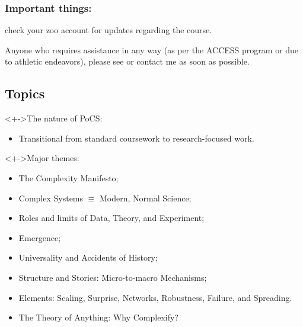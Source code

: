 \begin{frame}
  \frametitle{Important things:}

  \begin{block}{}
    \importantdates
  \end{block}

  \begin{block}{}
     check your zoo account for updates regarding the course.
  \end{block}

  \begin{block}{}
     Anyone who requires assistance in any way 
    (as per the ACCESS program
    or due to athletic endeavors), please see or contact me as soon as possible.
  \end{block}

\end{frame}


\subsection{Topics}

\begin{frame}

  \begin{block}<+->{The nature of PoCS:}
    \begin{itemize}
    \item
      Transitional from standard coursework to research-focused work.
    \end{itemize}
  \end{block}

  \begin{block}<+->{Major themes:}
    \begin{itemize}
    \item<+-> 
      The Complexity Manifesto;
    \item<+-> 
      Complex Systems $\equiv$ Modern, Normal Science;
    \item<+->
      Roles and limits of Data, Theory, and Experiment;
    \item<+->
      Emergence;
    \item<+->
      Universality and Accidents of History;
    \item<+-> 
      Structure and Stories: Micro-to-macro Mechanisms;
    \item<+->
      Elements: 
      Scaling, Surprise, Networks, 
      Robustness, Failure,
      and
      Spreading.
    \item<+-> 
      The Theory of Anything: Why Complexify?
    \end{itemize}
  \end{block}



\end{frame}



